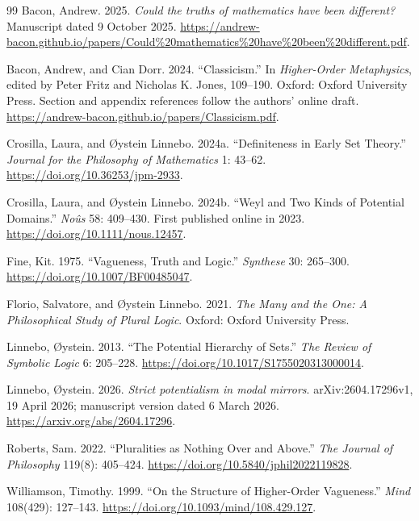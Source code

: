\documentclass[11pt]{article}
\theoremstyle{definition}
\numberwithin{equation}{section}
\begin{document}
\begin{thebibliography}{99}
Bacon, Andrew. 2025. \emph{Could the truths of mathematics have been different?} Manuscript dated 9 October 2025. \url{https://andrew-bacon.github.io/papers/Could%20mathematics%20have%20been%20different.pdf}.

Bacon, Andrew, and Cian Dorr. 2024. ``Classicism.'' In \emph{Higher-Order Metaphysics}, edited by Peter Fritz and Nicholas K. Jones, 109--190. Oxford: Oxford University Press. Section and appendix references follow the authors' online draft. \url{https://andrew-bacon.github.io/papers/Classicism.pdf}.

Crosilla, Laura, and \O ystein Linnebo. 2024a. ``Definiteness in Early Set Theory.'' \emph{Journal for the Philosophy of Mathematics} 1: 43--62. \url{https://doi.org/10.36253/jpm-2933}.

Crosilla, Laura, and \O ystein Linnebo. 2024b. ``Weyl and Two Kinds of Potential Domains.'' \emph{No\^us} 58: 409--430. First published online in 2023. \url{https://doi.org/10.1111/nous.12457}.

Fine, Kit. 1975. ``Vagueness, Truth and Logic.'' \emph{Synthese} 30: 265--300. \url{https://doi.org/10.1007/BF00485047}.

Florio, Salvatore, and \O ystein Linnebo. 2021. \emph{The Many and the One: A Philosophical Study of Plural Logic}. Oxford: Oxford University Press.

Linnebo, \O ystein. 2013. ``The Potential Hierarchy of Sets.'' \emph{The Review of Symbolic Logic} 6: 205--228. \url{https://doi.org/10.1017/S1755020313000014}.

Linnebo, \O ystein. 2026. \emph{Strict potentialism in modal mirrors}. arXiv:2604.17296v1, 19 April 2026; manuscript version dated 6 March 2026. \url{https://arxiv.org/abs/2604.17296}.

Roberts, Sam. 2022. ``Pluralities as Nothing Over and Above.'' \emph{The Journal of Philosophy} 119(8): 405--424. \url{https://doi.org/10.5840/jphil2022119828}.

Williamson, Timothy. 1999. ``On the Structure of Higher-Order Vagueness.'' \emph{Mind} 108(429): 127--143. \url{https://doi.org/10.1093/mind/108.429.127}.
\end{thebibliography}
\end{document}

